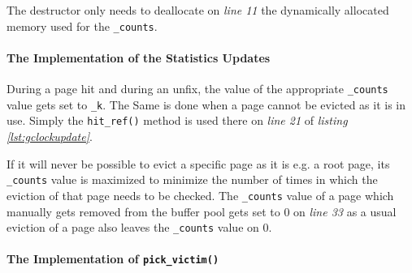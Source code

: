 	The destructor only needs to deallocate on \emph{line 11} the dynamically allocated memory used for the \lstinline{_counts}.

\paragraph{The Implementation of the Statistics Updates}

\begin{@empty}
	\lstset{
		language = [ISO]C++,
		style = basic
	}
	\begin{code}[ht!]
		\caption{Implementation of \lstinline{page_evictioner_gclock::hit_ref()}, \lstinline{used_ref()}, \lstinline{block_ref()} and \lstinline{unbuffered()}} \label{lst:gclockupdate}
		
	\end{code}
\end{@empty}

	During a page hit and during an unfix, the value of the appropriate \lstinline{_counts} value gets set to \lstinline{_k}. The Same is done when a page cannot be evicted as it is in use. Simply the \lstinline{hit_ref()} method is used there on \emph{line 21} of \emph{listing \ref{lst:gclockupdate}}.
	
	If it will never be possible to evict a specific page as it is e.g. a root page, its \lstinline{_counts} value is maximized to minimize the number of times in which the eviction of that page needs to be checked. The \lstinline{_counts} value of a page which manually gets removed from the buffer pool gets set to $0$ on \emph{line 33} as a usual eviction of a page also leaves the \lstinline{_counts} value on $0$.
	
\paragraph{The Implementation of \lstinline{pick_victim()}}

\begin{@empty}
	\lstset{
		language = [ISO]C++,
		style = basic
	}
	\begin{code}[ht!]
		\caption{Implementation of \lstinline{page_evictioner_gclock::pick_victim()}} \label{lst:gclockpickvictim}
		
	\end{code}
	\begin{code}[ht!]
		\ContinuedFloat
		\caption{Implementation of \lstinline{page_evictioner_gclock::pick_victim()} (cont.)}
		
	\end{code}
\end{@empty}

